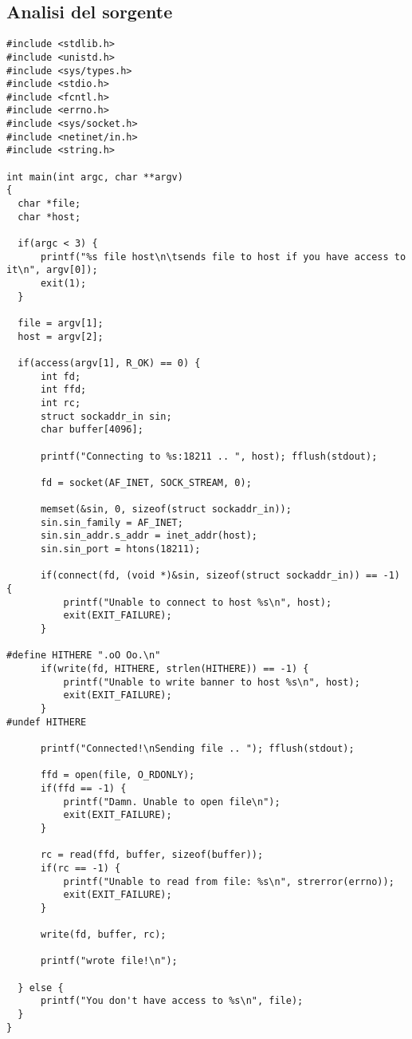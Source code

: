 \subsection{Analisi del sorgente}
\begin{lstlisting}[style=cstyle]
#include <stdlib.h>
#include <unistd.h>
#include <sys/types.h>
#include <stdio.h>
#include <fcntl.h>
#include <errno.h>
#include <sys/socket.h>
#include <netinet/in.h>
#include <string.h>

int main(int argc, char **argv)
{
  char *file;
  char *host;

  if(argc < 3) {
      printf("%s file host\n\tsends file to host if you have access to it\n", argv[0]);
      exit(1);
  }

  file = argv[1];
  host = argv[2];

  if(access(argv[1], R_OK) == 0) {
      int fd;
      int ffd;
      int rc;
      struct sockaddr_in sin;
      char buffer[4096];

      printf("Connecting to %s:18211 .. ", host); fflush(stdout);

      fd = socket(AF_INET, SOCK_STREAM, 0);

      memset(&sin, 0, sizeof(struct sockaddr_in));
      sin.sin_family = AF_INET;
      sin.sin_addr.s_addr = inet_addr(host);
      sin.sin_port = htons(18211);

      if(connect(fd, (void *)&sin, sizeof(struct sockaddr_in)) == -1) {
          printf("Unable to connect to host %s\n", host);
          exit(EXIT_FAILURE);
      }

#define HITHERE ".oO Oo.\n"
      if(write(fd, HITHERE, strlen(HITHERE)) == -1) {
          printf("Unable to write banner to host %s\n", host);
          exit(EXIT_FAILURE);
      }
#undef HITHERE

      printf("Connected!\nSending file .. "); fflush(stdout);

      ffd = open(file, O_RDONLY);
      if(ffd == -1) {
          printf("Damn. Unable to open file\n");
          exit(EXIT_FAILURE);
      }

      rc = read(ffd, buffer, sizeof(buffer));
      if(rc == -1) {
          printf("Unable to read from file: %s\n", strerror(errno));
          exit(EXIT_FAILURE);
      }

      write(fd, buffer, rc);

      printf("wrote file!\n");

  } else {
      printf("You don't have access to %s\n", file);
  }
}
\end{lstlisting}
